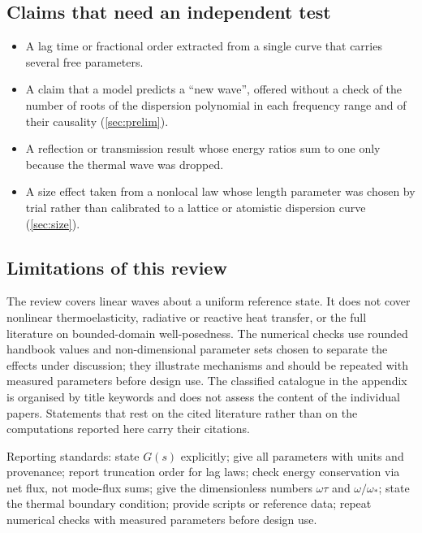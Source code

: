 \subsection{Claims that need an independent test}
\begin{itemize}
\item A lag time or fractional order extracted from a single curve that carries several free parameters.
\item A claim that a model predicts a ``new wave'', offered without a check of the number of roots of the dispersion polynomial in each frequency range and of their causality (\cref{sec:prelim}).
\item A reflection or transmission result whose energy ratios sum to one only because the thermal wave was dropped.
\item A size effect taken from a nonlocal law whose length parameter was chosen by trial rather than calibrated to a lattice or atomistic dispersion curve (\cref{sec:size}).
\end{itemize}

\subsection{Limitations of this review}
The review covers linear waves about a uniform reference state. It does not cover nonlinear thermoelasticity, radiative or reactive heat transfer, or the full literature on bounded-domain well-posedness. The numerical checks use rounded handbook values and non-dimensional parameter sets chosen to separate the effects under discussion; they illustrate mechanisms and should be repeated with measured parameters before design use. The classified catalogue in the appendix is organised by title keywords and does not assess the content of the individual papers. Statements that rest on the cited literature rather than on the computations reported here carry their citations.

\begin{summarybox}[Summary]
Reporting standards: state $G(s)$ explicitly; give all parameters with units and provenance; report truncation order for lag laws; check energy conservation via net flux, not mode-flux sums; give the dimensionless numbers $\omega\tau$ and $\omega/\omega_*$; state the thermal boundary condition; provide scripts or reference data; repeat numerical checks with measured parameters before design use.
\end{summarybox}
